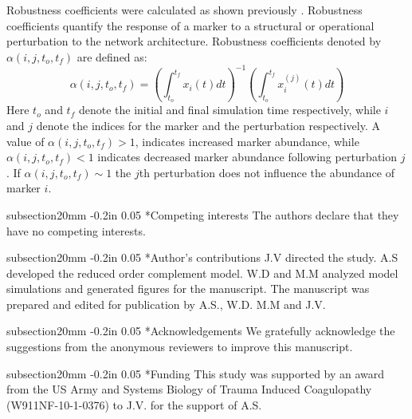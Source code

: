 \documentclass[12pt]{article}
\makeatletter
\renewcommand\section{\@startsection
	{subsection}{2}{0mm}
	{-0.2in}
	{0.05\baselineskip}
	{\normalfont\large\bfseries}}
\makeatother
\begin{document}
Robustness coefficients were calculated as shown previously \cite{Tasseff:2011aa}.
Robustness coefficients quantify the response of a marker to a structural or operational perturbation to the network architecture.
Robustness coefficients denoted by $\alpha\left(i,j,t_{o},t_{f}\right)$ are defined as:
\begin{equation}
\alpha\left(i,j,t_{o},t_{f}\right)=\left(\displaystyle\int_{t_{o}}^{t_{f}}x_{i}\left(t\right)dt\right)^{-1}\left(\displaystyle\int_{t_{o}}^{t_{f}}x^{(j)}_{i}\left(t\right)dt\right)
\end{equation}
Here $t_o$ and $t_f$ denote the initial and final simulation time respectively, while $i$ and $j$ denote the indices for the marker and the perturbation respectively.
A value of $\alpha\left(i,j,t_{o},t_{f}\right)>1$, indicates increased marker abundance, while $\alpha\left(i,j,t_{o},t_{f}\right)<1$ indicates decreased marker abundance following perturbation $j$. If $\alpha\left(i,j,t_{o},t_{f}\right)\sim{1}$ the $j$th perturbation does not influence the abundance of marker $i$.


\clearpage

\section*{Competing interests}
The authors declare that they have no competing interests.

\section*{Author's contributions}
J.V directed the study. A.S developed the reduced order complement model.
W.D and M.M analyzed model simulations and generated figures for the manuscript.
The manuscript was prepared and edited for publication by A.S., W.D. M.M and J.V.

\section*{Acknowledgements}
We gratefully acknowledge the suggestions from the anonymous reviewers to improve this manuscript.

\section*{Funding}
This study was supported by an award from the US Army and Systems Biology of Trauma Induced Coagulopathy (W911NF-10-1-0376) to J.V. for the support of A.S.
\end{document}
